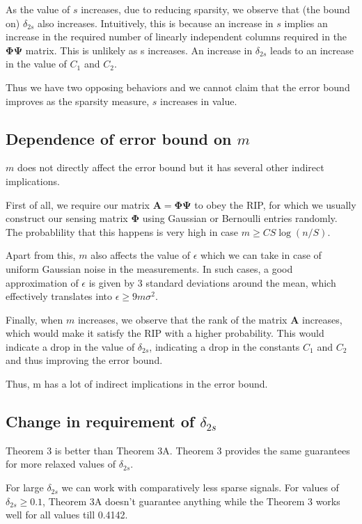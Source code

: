 \documentclass[a4paper,11pt]{article}
\numberwithin{definition}{section}
\numberwithin{mytheorem}{subsection}
\begin{document}
As the value of $s$ increases, due to reducing sparsity, we observe that (the bound on) $\delta_{2s}$ also increases. Intuitively, this is because an increase in $s$ implies an increase in the required number of linearly independent columns required in the $\boldsymbol{\Phi \Psi}$ matrix. This is unlikely as s increases. An increase in $\delta_{2s}$ leads to an increase in the value of $C_1$ and $C_2$.

Thus we have two opposing behaviors and we cannot claim that the error bound improves as the sparsity measure, $s$ increases in value.

\subsection{Dependence of error bound on $m$}

$m$ does not directly affect the error bound but it has several other indirect implications. 

First of all, we require our matrix $\boldsymbol{A}=\boldsymbol{\Phi \Psi}$ to obey the RIP, for which we usually construct our sensing matrix $\boldsymbol{\Phi}$ using Gaussian or Bernoulli entries randomly. The probablility that this happens is very high in case $m \geq CS \log(n/S)$.

Apart from this, $m$ also affects the value of $\epsilon$ which we can take in case of uniform Gaussian noise in the measurements. In such cases, a good approximation of $\epsilon$ is given by 3 standard deviations around the mean, which effectively translates into $\epsilon \geq 9m\sigma^2$.

Finally, when $m$ increases, we observe that the rank of the matrix $\boldsymbol{A}$ increases, which would make it satisfy the RIP with a higher probability. This would indicate a drop in the value of $\delta_{2s}$, indicating a drop in the constants $C_1$ and $C_2$ and thus improving the error bound.

Thus, m has a lot of indirect implications in the error bound.

\subsection{Change in requirement of $\delta_{2s}$}

Theorem 3 is better than Theorem 3A. Theorem 3 provides the same guarantees for more relaxed values of $\delta_{2s}$.

For large $\delta_{2s}$ we can work with comparatively less sparse signals. For values of $\delta_{2s} \geq 0.1$, Theorem 3A doesn't guarantee anything while the Theorem 3 works well for all values till 0.4142.
\end{document}
